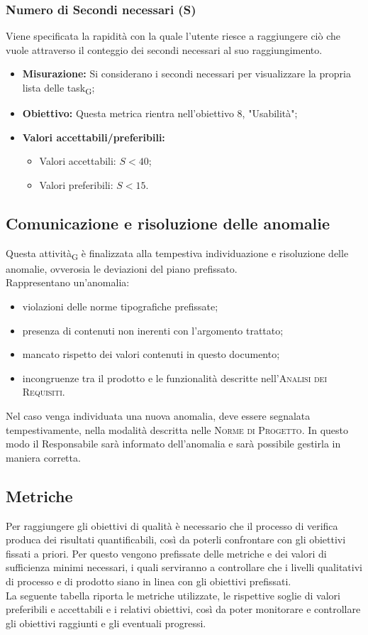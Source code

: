 \subsubsection{Numero di Secondi necessari (S)}
Viene specificata la rapidità con la quale l'utente riesce a raggiungere ciò che vuole attraverso il conteggio dei secondi necessari al suo raggiungimento.
\begin{itemize}
	\item \textbf{Misurazione:} Si considerano i secondi necessari per visualizzare la propria lista delle task\textsubscript{G};
	\item \textbf{Obiettivo:} Questa metrica rientra nell'obiettivo 8, "Usabilità";
	\item \textbf{Valori accettabili/preferibili: }
	\begin{itemize}
		\item Valori accettabili: $S < 40$;
		\item Valori preferibili: $S < 15$.
	\end{itemize}
\end{itemize}


\subsection{Comunicazione e risoluzione delle anomalie}

Questa attività\textsubscript{G} è finalizzata alla tempestiva individuazione e risoluzione delle anomalie, ovverosia le deviazioni del piano prefissato.\\ Rappresentano un'anomalia:
\begin{itemize}
    \item violazioni delle norme tipografiche prefissate;
    \item presenza di contenuti non inerenti con l'argomento trattato;
    \item mancato rispetto dei valori contenuti in questo documento;
    \item incongruenze tra il prodotto e le funzionalità descritte nell'\textsc{Analisi dei Requisiti}.
\end{itemize}
Nel caso venga individuata una nuova anomalia, deve essere segnalata tempestivamente, nella modalità descritta nelle \textsc{Norme di Progetto}. In questo modo il Responsabile sarà informato dell'anomalia e sarà possibile gestirla in maniera corretta.
\pagebreak
\subsection{Metriche}
Per raggiungere gli obiettivi di qualità è necessario che il processo di verifica produca dei risultati quantificabili, così da poterli confrontare con gli obiettivi fissati a priori. Per questo vengono prefissate delle metriche e dei valori di sufficienza minimi necessari, i quali serviranno a controllare che i livelli qualitativi di processo e di prodotto siano in linea con gli obiettivi prefissati.\\La seguente tabella riporta le metriche utilizzate, le rispettive soglie di valori preferibili e accettabili e i relativi obiettivi, così da poter monitorare e controllare gli obiettivi raggiunti e gli eventuali progressi.

